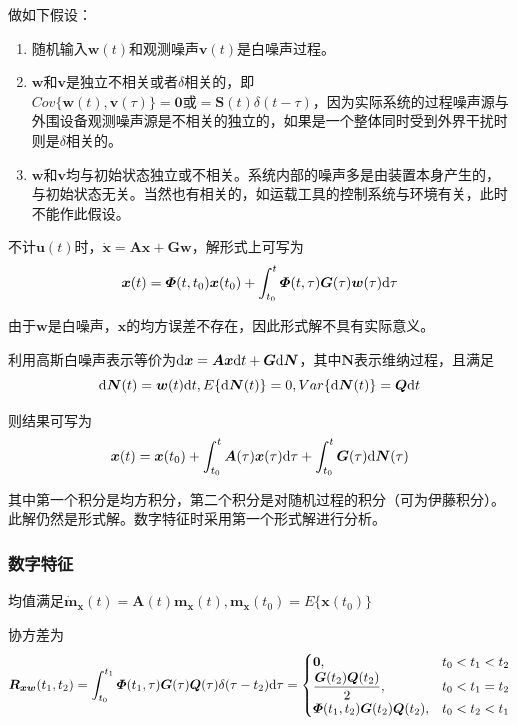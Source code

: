 \documentclass[11pt,a4paper]{ctexart}
\renewcommand{\d}{{\rm d}}
\begin{document}
            做如下假设：
            \begin{enumerate}
                \item 随机输入$\bm w(t)$和观测噪声$\bm v(t)$是白噪声过程。
                \item $\bm w$和$\bm v$是独立不相关或者$\delta$相关的，即$Cov\{\bm w(t),\bm v(\tau)\}=\bm 0\text{或}=\bm S(t)\delta(t-\tau)$，因为实际系统的过程噪声源与外围设备观测噪声源是不相关的独立的，如果是一个整体同时受到外界干扰时则是$\delta$相关的。
                \item $\bm w$和$\bm v$均与初始状态独立或不相关。系统内部的噪声多是由装置本身产生的，与初始状态无关。当然也有相关的，如运载工具的控制系统与环境有关，此时不能作此假设。
            \end{enumerate}

            不计$\bm u(t)$时，$\bm{\dot x}=\bm{Ax}+\bm{Gw}$，解形式上可写为
            \[
            \bm x(t)=\bm\varPhi(t,t_0)\bm x(t_0)+\int_{t_0}^t\bm\varPhi(t,\tau)\bm G(\tau)\bm w(\tau)\d\tau
            \]
            
            由于$\bm w$是白噪声，$\bm x$的均方误差不存在，因此形式解不具有实际意义。
            
            利用高斯白噪声表示等价为$\d\bm x=\bm{Ax}\d t+\bm{G}\d\bm N$，其中$\bm N$表示维纳过程，且满足
            \[
            \d\bm N(t)=\bm w(t)\d t,E\{\d \bm N(t)\}=0,Var\{\d \bm N(t)\}=\bm Q\d t
            \]
            
            则结果可写为
            \[
            \bm x(t)=\bm x(t_0)+\int_{t_0}^t\bm A(\tau)\bm x(\tau)\d\tau+\int_{t_0}^t\bm G(\tau)\d\bm N(\tau)
            \]

            其中第一个积分是均方积分，第二个积分是对随机过程的积分（可为伊藤积分）。此解仍然是形式解。数字特征时采用第一个形式解进行分析。
        \subsubsection{数字特征}
            均值满足$\bm{\dot m_x}(t)=\bm A(t)\bm{m_x}(t),\bm{m_x}(t_0)=E\{\bm x(t_0)\}$
            
            协方差为
            \[
            \bm{R_{xw}}(t_1,t_2)=\int_{t_0}^{t_1}\bm\varPhi(t_1,\tau)\bm G(\tau)\bm Q(\tau)\delta(\tau-t_2)\d\tau=
            \begin{cases}
            \bm 0,&t_0<t_1<t_2\\
            \dfrac{\bm G(t_2)\bm Q(t_2)}{2},&t_0<t_1=t_2\\
            \bm\varPhi(t_1,t_2)\bm G(t_2)\bm Q(t_2),&t_0<t_2<t_1\\
            \end{cases}
            \]
\end{document}
